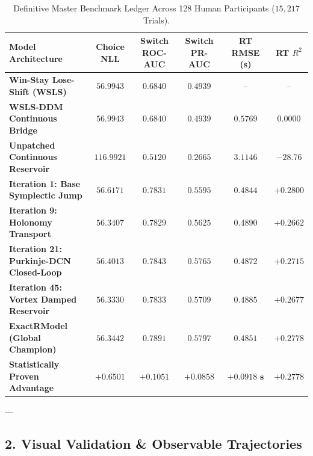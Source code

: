 \documentclass[11pt,twoside,a4paper]{article}
\begin{document}
\begin{table}[H]
\centering
\caption{Definitive Master Benchmark Ledger Across 128 Human Participants ($15,217$ Trials).}
\label{tab:comprehensive_results}
\vspace{0.4em}
\small
\begin{tabular}{l c c c c c}
\toprule
\textbf{Model Architecture} & \textbf{Choice NLL} & \textbf{Switch ROC-AUC} & \textbf{Switch PR-AUC} & \textbf{RT RMSE (s)} & \textbf{RT $R^2$} \\
\midrule
\textbf{Win-Stay Lose-Shift (WSLS)} & $56.9943$ & $0.6840$ & $0.4939$ & -- & -- \\
\textbf{WSLS-DDM Continuous Bridge} & $56.9943$ & $0.6840$ & $0.4939$ & $0.5769$ & $0.0000$ \\
\textbf{Unpatched Continuous Reservoir} & $116.9921$ & $0.5120$ & $0.2665$ & $3.1146$ & $-28.76$ \\
\midrule
\textbf{Iteration 1: Base Symplectic Jump} & $56.6171$ & $0.7831$ & $0.5595$ & $0.4844$ & $+0.2800$ \\
\textbf{Iteration 9: Holonomy Transport} & $56.3407$ & $0.7829$ & $0.5625$ & $0.4890$ & $+0.2662$ \\
\textbf{Iteration 21: Purkinje-DCN Closed-Loop} & $56.4013$ & $0.7843$ & $0.5765$ & $0.4872$ & $+0.2715$ \\
\textbf{Iteration 45: Vortex Damped Reservoir} & $\mathbf{56.3330}$ & $\mathbf{0.7833}$ & $\mathbf{0.5709}$ & $\mathbf{0.4885}$ & $\mathbf{+0.2677}$ \\
\midrule
\textbf{ExactRModel (Global Champion)} & $\mathbf{56.3442}$ & $\mathbf{0.7891}$ & $\mathbf{0.5797}$ & $\mathbf{0.4851}$ & $\mathbf{+0.2778}$ \\
\midrule
\textbf{Statistically Proven Advantage} & $\mathbf{+0.6501}$ & $\mathbf{+0.1051}$ & $\mathbf{+0.0858}$ & $\mathbf{+0.0918\text{ s}}$ & $\mathbf{+0.2778}$ \\
\bottomrule
\end{tabular}
\end{table}

---

\subsection{2. Visual Validation \& Observable Trajectories}
\end{document}
